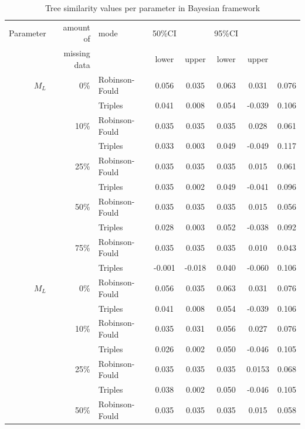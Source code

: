 \documentclass[12pt,letterpaper]{article}
\begin{document}
\begin{table}
\caption{Tree similarity values per parameter in Bayesian framework}
\centering
\begin{tabular}{rrlccccc}
    \hline
    Parameter & amount of    & mode & 50\%CI &       & 95\%CI & \\
              & missing data &      & lower  & upper & lower  & upper \\
    \hline
    $M_L$     & 0\%          & Robinson-Fould & 0.056 & 0.035  & 0.063 & 0.031   & 0.076 \\ %
              &              & Triples        & 0.041 & 0.008  & 0.054 & -0.039  & 0.106 \\
              & 10\%         & Robinson-Fould & 0.035 & 0.035  & 0.035 & 0.028   & 0.061 \\
              &              & Triples        & 0.033 & 0.003  & 0.049 & -0.049  & 0.117 \\
              & 25\%         & Robinson-Fould & 0.035 & 0.035  & 0.035 & 0.015   & 0.061 \\
              &              & Triples        & 0.035 & 0.002  & 0.049 & -0.041  & 0.096 \\
              & 50\%         & Robinson-Fould & 0.035 & 0.035  & 0.035 & 0.015   & 0.056 \\
              &              & Triples        & 0.028 & 0.003  & 0.052 & -0.038  & 0.092 \\
              & 75\%         & Robinson-Fould & 0.035 & 0.035  & 0.035 & 0.010   & 0.043 \\
              &              & Triples        & -0.001 & -0.018 & 0.040 & -0.060 & 0.106 \\
    $M_L$     & 0\%          & Robinson-Fould & 0.056 & 0.035  & 0.063 & 0.031   & 0.076 \\
              &              & Triples        & 0.041 & 0.008  & 0.054 & -0.039  & 0.106 \\
              & 10\%         & Robinson-Fould & 0.035 & 0.031  & 0.056 & 0.027   & 0.076 \\
              &              & Triples        & 0.026 & 0.002  & 0.050 & -0.046  & 0.105 \\
              & 25\%         & Robinson-Fould & 0.035 & 0.035  & 0.035 & 0.0153  & 0.068 \\
              &              & Triples        & 0.038 & 0.002  & 0.050 & -0.046  & 0.105 \\
              & 50\%         & Robinson-Fould & 0.035 & 0.035  & 0.035 & 0.015   & 0.058 \\

\end{tabular}
\end{table}
\end{document}
